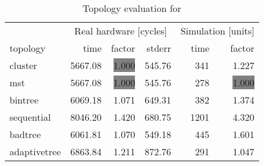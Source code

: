\begin{table}[htb]
  \centering
  \begin{tabular}{lrrrrr}
  \toprule
  & \multicolumn{3}{c}{Real hardware [cycles]} & \multicolumn{2}{c}{Simulation [units]} \\
  topology & time & factor & stderr & time & factor \\
  \midrule
  cluster & 5667.08 & \colorbox{gray}{1.000} & 545.76 & 341 & 1.227 \\
  mst & 5667.08 & \colorbox{gray}{1.000} & 545.76 & 278 & \colorbox{gray}{1.000} \\
  bintree & 6069.18 & 1.071 & 649.31 & 382 & 1.374 \\
  sequential & 8046.20 & 1.420 & 680.75 & 1201 & 4.320 \\
  badtree & 6061.81 & 1.070 & 549.18 & 445 & 1.601 \\
  adaptivetree & 6863.84 & 1.211 & 872.76 & 291 & 1.047 \\
  \midrule
  \end{tabular}
  \caption{Topology evaluation for \appenzeller}
  \label{tab:appenzeller}
\end{table}
